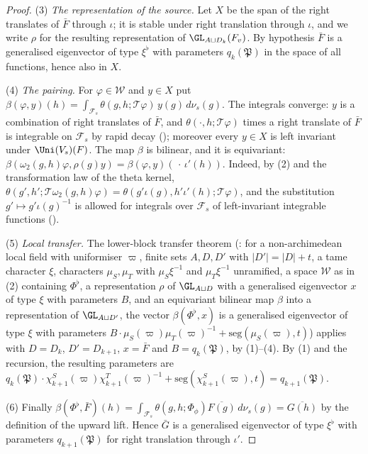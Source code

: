 \begin{proof}
(3) \emph{The representation of the source.} Let $X$ be the span of the right translates of $\bar F$ through $\iota$; it is stable under right
translation through $\iota$, and we write $\rho$ for the resulting representation of $\GL_{A\sqcup D_k}(F_v)$. By hypothesis $\bar F$ is a generalised
eigenvector of type $\xi^\flat$ with parameters $q_k(\mathfrak P)$ in the space of all functions, hence also in $X$.

(4) \emph{The pairing.} For $\varphi\in\mathcal W$ and $y\in X$ put $\beta(\varphi,y)(h)=\int_{\mathcal F_s}\theta(g,h;\mathcal T\varphi)\,y(g)\,d\nu_s(g)$.
The integrals converge: $y$ is a combination of right translates of $\bar F$, and $\theta(\cdot,h;\mathcal T\varphi)$ times a right translate of $\bar F$
is integrable on $\mathcal F_s$ by rapid decay (); moreover every
$y\in X$ is left invariant under $\Uni(V_s)(F)$. The map $\beta$ is bilinear, and it is equivariant:
$\beta(\omega_2(g,h)\varphi,\rho(g)y)=\beta(\varphi,y)(\,\cdot\,\iota'(h))$. Indeed, by (2) and the transformation law of the theta kernel,
$\theta(g',h';\mathcal T\omega_2(g,h)\varphi)=\theta(g'\iota(g),h'\iota'(h);\mathcal T\varphi)$, and the substitution $g'\mapsto g'\iota(g)^{-1}$ is
allowed for integrals over $\mathcal F_s$ of left-invariant integrable functions ().

(5) \emph{Local transfer.} The lower-block transfer theorem (: for a
non-archimedean local field with uniformiser $\varpi$, finite sets $A,D,D'$ with $|D'|=|D|+t$, a tame character $\xi$, characters $\mu_S,\mu_T$ with
$\mu_S\xi^{-1}$ and $\mu_T\xi^{-1}$ unramified, a space $\mathcal W$ as in (2) containing $\Phi^\flat$, a representation $\rho$ of
$\GL_{A\sqcup D}$ with a generalised eigenvector $x$ of type $\xi$ with parameters $B$, and an equivariant bilinear map $\beta$ into a representation
of $\GL_{A\sqcup D'}$, the vector $\beta(\Phi^\flat,x)$ is a generalised eigenvector of type $\xi$ with parameters
$B\cdot\mu_S(\varpi)\mu_T(\varpi)^{-1}+\mathrm{seg}(\mu_S(\varpi),t)$) applies with $D=D_k$, $D'=D_{k+1}$, $x=\bar F$ and $B=q_k(\mathfrak P)$, by
(1)--(4). By (1) and the recursion, the resulting parameters are
$q_k(\mathfrak P)\cdot\chi^S_{k+1}(\varpi)\chi^T_{k+1}(\varpi)^{-1}+\mathrm{seg}(\chi^S_{k+1}(\varpi),t)=q_{k+1}(\mathfrak P)$.

(6) Finally $\beta(\Phi^\flat,\bar F)(h)=\int_{\mathcal F_s}\theta(g,h;\Phi_\phi)\overline{F(g)}\,d\nu_s(g)=\overline{G(h)}$ by the definition of the upward
lift. Hence $\bar G$ is a generalised eigenvector of type $\xi^\flat$ with parameters $q_{k+1}(\mathfrak P)$ for right translation through $\iota'$.
\end{proof}

